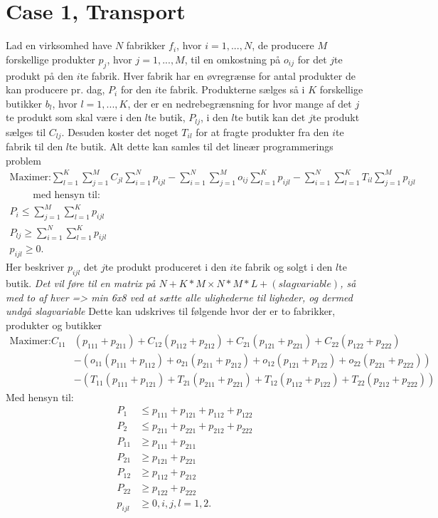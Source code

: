 \section{Case 1, Transport}
Lad en virksomhed have $N$ fabrikker $f_i$, hvor $i = 1,...,N$, de producere $M$ forskellige produkter $p_j$, hvor $j = 1,..., M$, til en omkostning på $o_{ij}$ for det $j$te produkt på den $i$te fabrik. 
Hver fabrik har en øvregrænse for antal produkter de kan producere pr. dag, $P_i$ for den $i$te fabrik.
Produkterne sælges så i $K$ forskellige butikker $b_l$, hvor $l= 1,...,K$, der er en nedrebegrænsning for hvor mange af det $j$te produkt som skal være i den $l$te butik, $P_{lj}$, i den $l$te butik kan det $j$te produkt sælges til $C_{lj}$.
Desuden koster det noget $T_{il}$ for at fragte produkter fra den $i$te fabrik til den $l$te butik.
Alt dette kan samles til det lineær programmerings problem
\begin{align*}
\text{Maximer:} \sum_{l=1}^K \sum_{j=1}^M C_{jl} \sum_{i=1}^N p_{ijl} - \sum_{i=1}^N\sum_{j=1}^M o_{ij} \sum_{l=1}^K p_{ijl} - \sum_{i=1}^N \sum_{l=1}^K T_{il} \sum_{j=1}^M p_{ijl}
\\\qquad \text{ med hensyn til:}
\\ P_i \leq \sum_{j=1}^M \sum_{l=1}^K p_{ijl}
\\ P_{lj} \geq  \sum_{i=1}^N \sum_{l=1}^K p_{ijl}
\\ p_{ijl} \geq 0.
\end{align*}
Her beskriver $p_{ijl}$ det $j$te produkt produceret i den $i$te fabrik og solgt i den $l$te butik.
\textit{Det vil føre til en matrix på $N+K*M \times N*M*L+(slag variable)$, så med to af hver => min 6x8 ved at sætte alle ulighederne til ligheder, og dermed undgå slagvariable}
Dette kan udskrives til følgende hvor der er to fabrikker, produkter og butikker
\begin{align*}
\text{Maximer:}  
C_{11}& ( p_{111} +  p_{211}) + C_{12} ( p_{112} +  p_{212}) + C_{21} ( p_{121} +  p_{221}) + C_{22} ( p_{122} +  p_{222})
\\ &- (o_{11} ( p_{111} + p_{112}) + o_{21} ( p_{211} + p_{212}) + o_{12} ( p_{121} + p_{122}) + o_{22} ( p_{221} + p_{222}))
\\&- ( T_{11} ( p_{111} + p_{121}) + T_{21} ( p_{211} + p_{221})  + T_{12} ( p_{112} + p_{122}) + T_{22} ( p_{212} + p_{222}) )
\end{align*}
Med hensyn til:
\begin{align*}
 P_1 & \leq p_{111} + p_{121} + p_{112} + p_{122}
\\ P_2 & \leq p_{211} + p_{221} + p_{212} + p_{222}
\\ P_{11} & \geq p_{111} + p_{211}
\\ P_{21} & \geq p_{121} + p_{221}
\\ P_{12} & \geq p_{112} + p_{212}
\\ P_{22} & \geq p_{122} + p_{222}
\\ p_{ijl} & \geq 0, i,j,l = 1, 2.
\end{align*}


